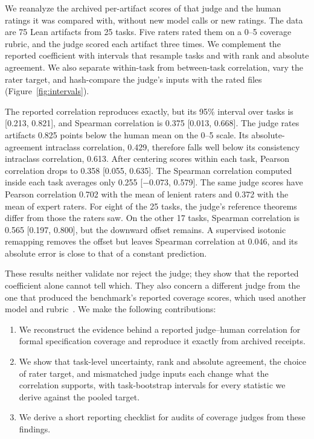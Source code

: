 We reanalyze the archived per-artifact scores of that judge and the human ratings it was compared with, without new model calls or new ratings.
The data are 75 Lean artifacts from 25 tasks.
Five raters rated them on a 0--5 coverage rubric, and the judge scored each artifact three times.
We complement the reported coefficient with intervals that resample tasks and with rank and absolute agreement.
We also separate within-task from between-task correlation, vary the rater target, and hash-compare the judge's inputs with the rated files (Figure~\ref{fig:intervals}).

The reported correlation reproduces exactly, but its 95\% interval over tasks is [0.213, 0.821], and Spearman correlation is 0.375 [0.013, 0.668].
The judge rates artifacts 0.825 points below the human mean on the 0--5 scale.
Its absolute-agreement intraclass correlation, 0.429, therefore falls well below its consistency intraclass correlation, 0.613.
After centering scores within each task, Pearson correlation drops to 0.358 [0.055, 0.635].
The Spearman correlation computed inside each task averages only 0.255 [$-0.073$, 0.579].
The same judge scores have Pearson correlation 0.702 with the mean of lenient raters and 0.372 with the mean of expert raters.
For eight of the 25 tasks, the judge's reference theorems differ from those the raters saw.
On the other 17 tasks, Spearman correlation is 0.565 [0.197, 0.800], but the downward offset remains.
A supervised isotonic remapping removes the offset but leaves Spearman correlation at 0.046, and its absolute error is close to that of a constant prediction.

These results neither validate nor reject the judge; they show that the reported coefficient alone cannot tell which.
They also concern a different judge from the one that produced the benchmark's reported coverage scores, which used another model and rubric~\citep{veribench2026}.
We make the following contributions:
\begin{enumerate}
\item We reconstruct the evidence behind a reported judge--human correlation for formal specification coverage and reproduce it exactly from archived receipts.
\item We show that task-level uncertainty, rank and absolute agreement, the choice of rater target, and mismatched judge inputs each change what the correlation supports, with task-bootstrap intervals for every statistic we derive against the pooled target.
\item We derive a short reporting checklist for audits of coverage judges from these findings.
\end{enumerate}

